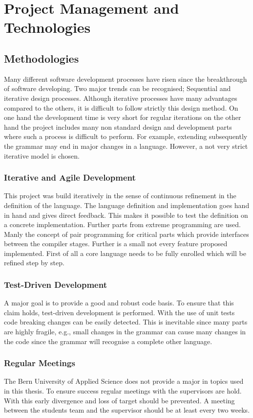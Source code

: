 \chapter{Project Management and Technologies}
\section{Methodologies}
Many different software development processes have risen since the
breakthrough of software developing. Two major trends can be recognised;
Sequential and iterative design processes. Although iterative processes
have many advantages compared to the others, it is difficult to follow
strictly this design method. On one hand the development time is very
short for regular iterations on the other hand the project includes
many non standard design and development parts where such a process is
difficult to perform. For example, extending subsequently the grammar may end
in major changes in a language. However, a not very strict iterative
model is chosen.

\subsection{Iterative and Agile Development}
This project was build iteratively in the sense of continuous
refinement in the definition of the language. The language definition and
implementation goes hand in hand and gives direct feedback. This makes it
possible to test the definition on a concrete implementation. Further
parts from extreme programming are used. Manly the concept of pair
programming for critical parts which provide interfaces between the
compiler stages. Further is a small not every feature proposed implemented.
First of all a core language needs to be fully enrolled which will be refined
step by step.

\subsection{Test-Driven Development}
A major goal is to provide a good and robust code basis. To ensure that
this claim holds, test-driven development is performed. With the use of
unit tests code breaking changes can be easily detected. This is inevitable
since many parts are highly fragile, e.g., small changes in the grammar can
cause many changes in the code since the grammar will recognise a complete
other language.

\subsection{Regular Meetings}
The Bern University of Applied Science does not provide a major in
topics used in this thesis. To ensure success regular meetings with the
supervisors are hold. With this early divergence and loss of target should
be prevented. A meeting between the students team and the supervisor
should be at least every two weeks.

